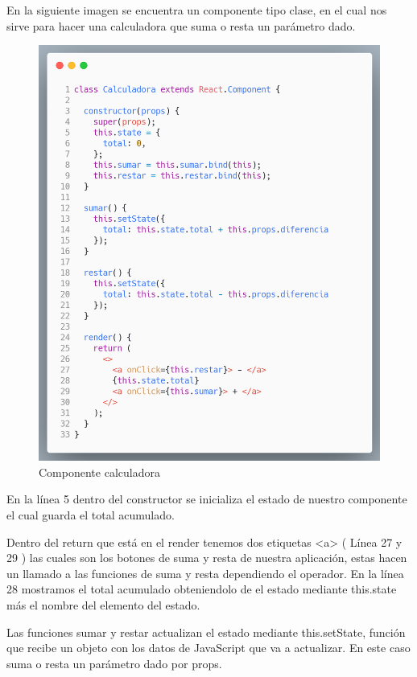 \begin{itemize}
En la siguiente imagen se encuentra un componente tipo clase, en el cual nos sirve para hacer una calculadora que suma o resta un parámetro dado.
 \newline
       \begin{figure}[H]
       \includegraphics[width=1\textwidth]{./Imagenes/classe.png}
        \caption[Componente calculadora]{Componente calculadora}
       \end{figure}
       \newline
    En la línea 5 dentro del constructor se inicializa el estado de nuestro componente el cual guarda el total acumulado.

Dentro del return que está en el render tenemos dos etiquetas <a> ( Línea 27 y 29 ) las cuales son los botones de suma y resta de nuestra aplicación, estas hacen un llamado a las funciones de suma y resta dependiendo el operador.
En la línea 28 mostramos el total acumulado obteniendolo de el estado mediante this.state más el nombre del elemento del estado.

Las funciones sumar y restar actualizan el estado mediante this.setState, función que recibe un objeto con los datos de JavaScript que va a actualizar. En este caso suma o resta un parámetro dado por props. 


\end{itemize}
